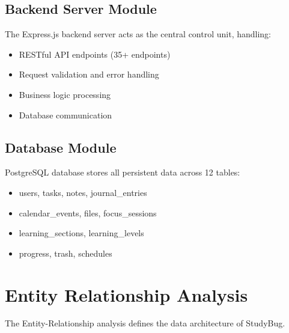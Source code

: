     \subsection{Backend Server Module}
    The Express.js backend server acts as the central control unit, handling:
    \begin{itemize}
        \item RESTful API endpoints (35+ endpoints)
        \item Request validation and error handling
        \item Business logic processing
        \item Database communication
    \end{itemize}

    \subsection{Database Module}
    PostgreSQL database stores all persistent data across 12 tables:
    \begin{itemize}
        \item users, tasks, notes, journal\_entries
        \item calendar\_events, files, focus\_sessions
        \item learning\_sections, learning\_levels
        \item progress, trash, schedules
    \end{itemize}

    \clearpage
    \section{Entity Relationship Analysis}
    The Entity-Relationship analysis defines the data architecture of StudyBug.

